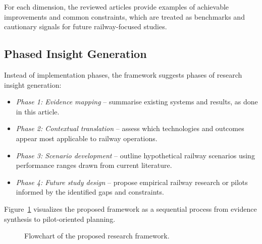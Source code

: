 \documentclass[conference]{IEEEtran}
\begin{document}
For each dimension, the reviewed articles provide examples of achievable improvements and common constraints, which are treated as benchmarks and cautionary signals for future railway-focused studies.

\subsection{Phased Insight Generation}

Instead of implementation phases, the framework suggests phases of research insight generation:

\begin{itemize}[leftmargin=*]
\item \textit{Phase 1: Evidence mapping} – summarise existing systems and results, as done in this article.
\item \textit{Phase 2: Contextual translation} – assess which technologies and outcomes appear most applicable to railway operations.
\item \textit{Phase 3: Scenario development} – outline hypothetical railway scenarios using performance ranges drawn from current literature.
\item \textit{Phase 4: Future study design} – propose empirical railway research or pilots informed by the identified gaps and constraints.
\end{itemize}

Figure~\ref{fig:framework-flowchart} visualizes the proposed framework as a sequential process from evidence synthesis to pilot-oriented planning.

\begin{figure}[H]
\centering
{}
\caption{Flowchart of the proposed research framework.}
\label{fig:framework-flowchart}
\end{figure}
\end{document}
